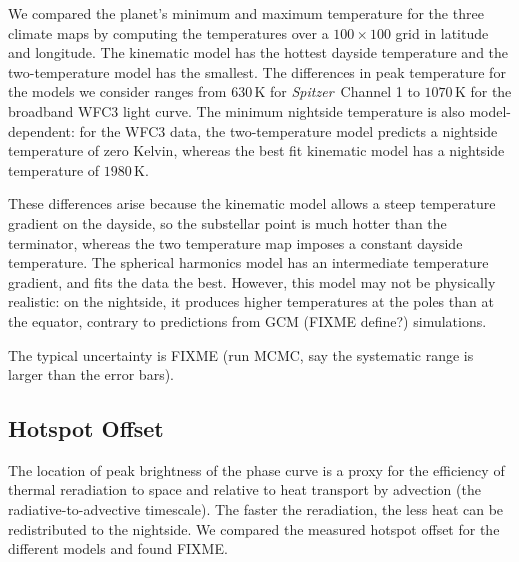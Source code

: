 \documentclass[twocolumn]{aastex61}
\newcommand{\project}[1]{\textsl{#1}}
\newcommand{\Spitzer}{\project{Spitzer}}
\begin{document}
We compared the planet's minimum and maximum temperature for the three climate maps by computing the temperatures over a $100\times100$ grid in latitude and longitude. The kinematic model has the hottest dayside temperature and the two-temperature model has the smallest. The differences in peak temperature for the models we consider ranges from $630\,\mathrm{K}$ for \Spitzer\ Channel 1 to $1070\,\mathrm{K}$ for the broadband WFC3 light curve. The minimum nightside temperature is also model-dependent: for the WFC3 data, the two-temperature model predicts a nightside temperature of zero Kelvin, whereas the best fit kinematic model has a nightside temperature of $1980\,\mathrm{K}$. %

These differences arise because the kinematic model allows a steep temperature gradient on the dayside, so the substellar point is much hotter than the terminator, whereas the two temperature map imposes a constant dayside temperature.  The spherical harmonics model has an intermediate temperature gradient, and fits the data the best. However, this model may not be physically realistic: on the nightside, it produces higher temperatures at the poles than at the equator, contrary to predictions from GCM (FIXME define?) simulations. 

The typical uncertainty is FIXME (run MCMC, say the systematic range is larger than the error bars). 



\subsection{Hotspot Offset}
The location of peak brightness of the phase curve is a proxy for the efficiency of thermal reradiation to space and relative to heat transport by advection (the radiative-to-advective timescale). The faster the reradiation, the less heat can be redistributed to the nightside. We compared the measured hotspot offset for the different models and found FIXME.
\end{document}
